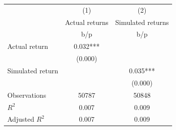 {
\def\sym#1{\ifmmode^{#1}\else\(^{#1}\)\fi}
\begin{tabular}{l*{2}{c}}
\hline\hline
                    &\multicolumn{1}{c}{(1)}&\multicolumn{1}{c}{(2)}\\
                    &\multicolumn{1}{c}{Actual returns}&\multicolumn{1}{c}{Simulated returns}\\
                    &         b/p   &         b/p   \\
\hline
Actual return       &       0.032***&               \\
                    &     (0.000)   &               \\
Simulated return    &               &       0.035***\\
                    &               &     (0.000)   \\
\hline
Observations        &       50787   &       50848   \\
\(R^{2}\)           &       0.007   &       0.009   \\
Adjusted \(R^{2}\)  &       0.007   &       0.009   \\
\hline\hline
\end{tabular}
}
